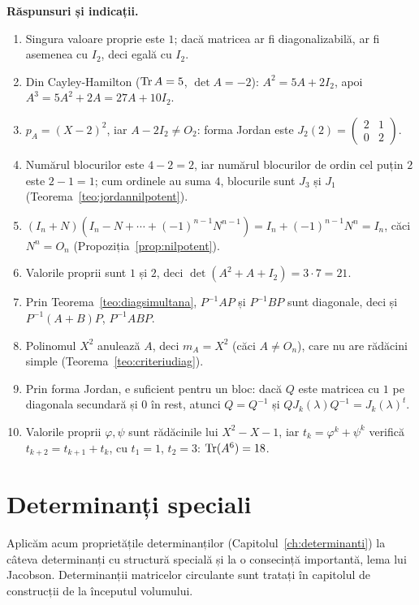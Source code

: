 \medskip\noindent\textbf{Răspunsuri și indicații.}
\begin{enumerate}[label=\textbf{\arabic*.},leftmargin=*]
\item Singura valoare proprie este $1$; dacă matricea ar fi diagonalizabilă, ar fi asemenea cu $I_2$, deci egală cu $I_2$.
\item Din Cayley-Hamilton ($\operatorname{Tr} A=5$, $\det A=-2$): $A^2=5A+2I_2$, apoi $A^3=5A^2+2A=27A+10I_2$.
\item $p_A=(X-2)^2$, iar $A-2I_2\neq O_2$: forma Jordan este $J_2(2)=\begin{pmatrix}2&1\\0&2\end{pmatrix}$.
\item Numărul blocurilor este $4-2=2$, iar numărul blocurilor de ordin cel puțin $2$ este $2-1=1$; cum ordinele au suma $4$, blocurile sunt $J_3$ și $J_1$ (Teorema~\ref{teo:jordannilpotent}).
\item $(I_n+N)(I_n-N+\cdots+(-1)^{n-1}N^{n-1})=I_n+(-1)^{n-1}N^n=I_n$, căci $N^n=O_n$ (Propoziția~\ref{prop:nilpotent}).
\item Valorile proprii sunt $1$ și $2$, deci $\det(A^2+A+I_2)=3\cdot7=21$.
\item Prin Teorema~\ref{teo:diagsimultana}, $P^{-1}AP$ și $P^{-1}BP$ sunt diagonale, deci și $P^{-1}(A+B)P$, $P^{-1}ABP$.
\item Polinomul $X^2$ anulează $A$, deci $m_A=X^2$ (căci $A\neq O_n$), care nu are rădăcini simple (Teorema~\ref{teo:criteriudiag}).
\item Prin forma Jordan, e suficient pentru un bloc: dacă $Q$ este matricea cu $1$ pe diagonala secundară și $0$ în rest, atunci $Q=Q^{-1}$ și $QJ_k(\lambda)Q^{-1}=J_k(\lambda)^t$.
\item Valorile proprii $\varphi,\psi$ sunt rădăcinile lui $X^2-X-1$, iar $t_k=\varphi^k+\psi^k$ verifică $t_{k+2}=t_{k+1}+t_k$, cu $t_1=1$, $t_2=3$: $\operatorname{Tr}(A^6)=18$.
\end{enumerate}

\chapter{Determinanți speciali}\label{ch:detspeciali}

Aplicăm acum proprietățile determinanților (Capitolul~\ref{ch:determinanti}) la câteva determinanți cu structură specială și la o consecință importantă, lema lui Jacobson. Determinanții matricelor circulante sunt tratați în capitolul de construcții de la începutul volumului.

